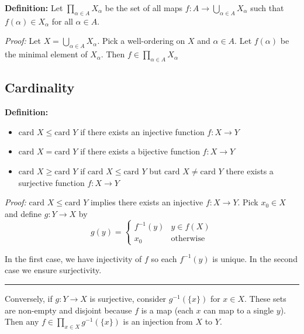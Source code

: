 \documentclass[12pt]{report}
\newcommand{\card}{\text{card }}
\renewcommand{\div}{\vspace*{10pt}\hrule\vspace*{10pt}}
\newenvironment*{tbox}[2][gray]{
    \begin{tcolorbox}[
        parbox=false,
        colback=#1!5!white,
        colframe=#1!75!black,
        breakable,
        title={#2}
    ]}
    {\end{tcolorbox}}
\begin{document}
    \textbf{Definition:} Let $\prod_{\alpha \in A} X_{\alpha}$ be the set of all maps $f: A \to \bigcup_{\alpha \in A} X_{\alpha}$ such that $f(\alpha) \in X_{\alpha}$ for all $\alpha \in A$.

    \begin{tbox}{\textbf{Axiom of Choice:} If $\{X_\alpha\}_{\alpha \in A}$ is a nonempty collection of nonempty sets, $\prod_{\alpha \in A} X_{\alpha}$ is nonempty, i.e. there exists at least one choice function $f$ }
        \emph{Proof:} Let $X = \bigcup_{\alpha \in A} X_{\alpha}$. Pick a well-ordering on $X$ and $\alpha \in A$. Let $f(\alpha)$ be the minimal element of $X_{\alpha}$. Then $f \in \prod_{\alpha \in A} X_{\alpha}$ 
    \end{tbox}

    \subsection*{Cardinality} 
        \textbf{Definition:} 
        \begin{itemize}
            \item $\card X \leq \card Y$ if there exists an injective function $f: X \to Y$
            \item $\card X = \card Y$ if there exists a bijective function $f: X \to Y$
            \item $\card X \geq \card Y$ if $\card X \leq \card Y$ but $\card X \neq \card Y$ there exists a surjective function $f: X \to Y$
        \end{itemize}

        \begin{tbox}{\textbf{Property:} $\card X \leq \card Y$ iff $\card Y \geq \card X$}
            \emph{Proof:} $\card X \leq \card Y$ implies there exists an injective $f: X \to Y$. Pick $x_0 \in X$ and define $g: Y \to X$ by 
            \[g(y) = \begin{cases}
                f^{-1}(y) & y \in f(X)\\
                x_0 & \text{otherwise}
            \end{cases}\]
            
            In the first case, we have injectivity of $f$ so each $f^{-1}(y)$ is unique. In the second case we ensure surjectivity. 

            \div 

            Conversely, if $g: Y \to X$ is surjective, consider $g^{-1}(\{x\})$ for $x \in X$. These sets are non-empty and disjoint because $f$ is a map (each $x$ can map to a single $y$). Then any $f \in \prod_{x \in X} g^{-1}(\{x\})$ is an injection from $X$ to $Y$.
        \end{tbox}
\end{document}
